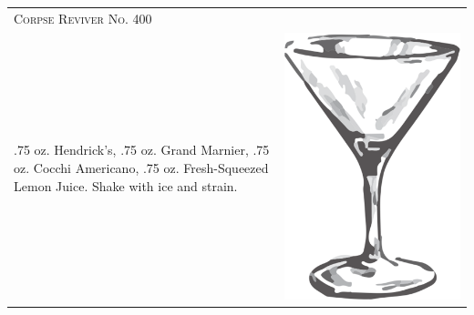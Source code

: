 \documentclass{article}
\begin{document}
\begin{multicols}{2}
\begin{tabular}{p{2in} p{0.5in}}
\multicolumn{2}{p{3in}}{\centering\Huge\textsc{Corpse Reviver No. 400}}\\ 
  \vspace{-0.1in}.75 oz. Hendrick's, .75 oz. Grand Marnier, .75 oz. Cocchi Americano, .75 oz. Fresh-Squeezed Lemon Juice. Shake with ice and strain. &
  \vspace{-0.1in} \includegraphics{goblet.png}
\end{tabular}\


\end{multicols}
\end{document}
